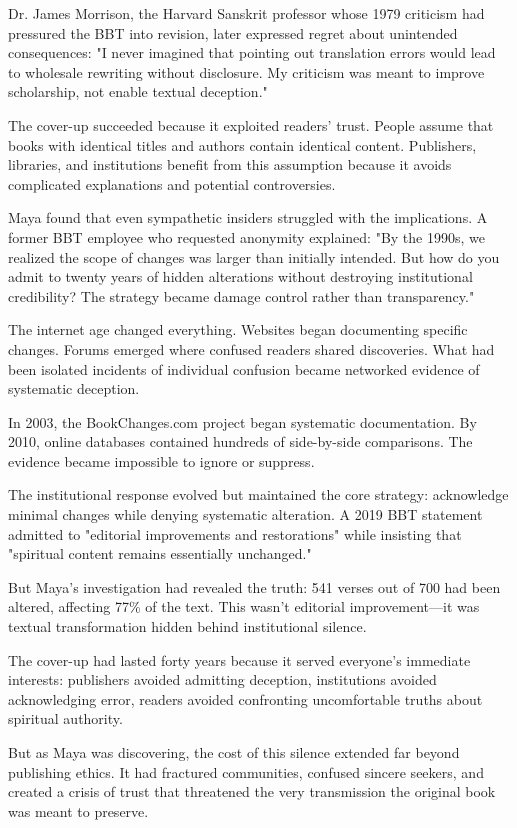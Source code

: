 \documentclass[11pt,twoside]{book}
\begin{document}
Dr. James Morrison, the Harvard Sanskrit professor whose 1979 criticism had pressured the BBT into revision, later expressed regret about unintended consequences: "I never imagined that pointing out translation errors would lead to wholesale rewriting without disclosure. My criticism was meant to improve scholarship, not enable textual deception."

The cover-up succeeded because it exploited readers' trust. People assume that books with identical titles and authors contain identical content. Publishers, libraries, and institutions benefit from this assumption because it avoids complicated explanations and potential controversies.

Maya found that even sympathetic insiders struggled with the implications. A former BBT employee who requested anonymity explained: "By the 1990s, we realized the scope of changes was larger than initially intended. But how do you admit to twenty years of hidden alterations without destroying institutional credibility? The strategy became damage control rather than transparency."

The internet age changed everything. Websites began documenting specific changes. Forums emerged where confused readers shared discoveries. What had been isolated incidents of individual confusion became networked evidence of systematic deception.

In 2003, the BookChanges.com project began systematic documentation. By 2010, online databases contained hundreds of side-by-side comparisons. The evidence became impossible to ignore or suppress.

The institutional response evolved but maintained the core strategy: acknowledge minimal changes while denying systematic alteration. A 2019 BBT statement admitted to "editorial improvements and restorations" while insisting that "spiritual content remains essentially unchanged."

But Maya's investigation had revealed the truth: 541 verses out of 700 had been altered, affecting 77\% of the text. This wasn't editorial improvement—it was textual transformation hidden behind institutional silence.

The cover-up had lasted forty years because it served everyone's immediate interests: publishers avoided admitting deception, institutions avoided acknowledging error, readers avoided confronting uncomfortable truths about spiritual authority.

But as Maya was discovering, the cost of this silence extended far beyond publishing ethics. It had fractured communities, confused sincere seekers, and created a crisis of trust that threatened the very transmission the original book was meant to preserve.
\end{document}
